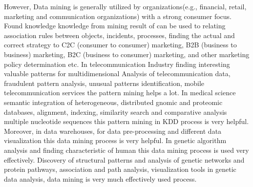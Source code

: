 However, Data mining is generally utilized by organizations(e.g., financial, retail, marketing and communication organizations) with a strong consumer focus. Found knowledge knowledge from mining result of can be used to relating association rules between objects, incidents, processes, finding the actual and correct strategy to C2C (consumer to consumer) marketing, B2B (business to business) marketing, B2C (business to consumer) marketing, and other marketing policy determination etc. In telecommunication Industry finding interesting valuable patterns for multidimensional Analysis of telecommunication data, fraudulent pattern analysis, unusual patterns identification, mobile telecommunication services the pattern mining helps a lot. In medical science semantic integration of heterogeneous, distributed gnomic and proteomic databases, alignment, indexing, similarity search and comparative analysis multiple nucleotide sequences this pattern mining in KDD process is very helpful. Moreover, in data warehouses, for data pre-processing and different data visualization this data mining process is very helpful. In genetic algorithm analysis and finding characteristic of human this data mining process is used very effectively. Discovery of structural patterns and analysis of genetic networks and protein pathways, association and path analysis, visualization tools in genetic data analysis, data mining is very much effectively used process.



